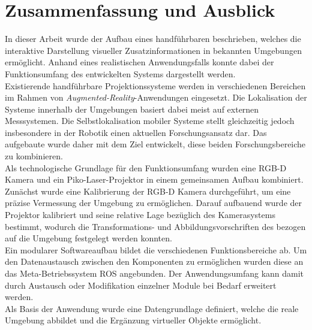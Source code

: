\chapter{Zusammenfassung und Ausblick}
\label{chap.zusammenfassung}

In dieser Arbeit wurde der Aufbau eines handführbaren \kps{} beschrieben, welches die interaktive Darstellung visueller Zusatzinformationen in bekannten Umgebungen ermöglicht. Anhand eines realistischen Anwendungsfalls konnte dabei der Funktionsumfang des entwickelten Systems dargestellt werden.\\

Existierende handführbare Projektionssysteme werden in verschiedenen Bereichen im Rahmen von \textit{Augmented-Reality}-Anwendungen eingesetzt. Die Lokalisation der Systeme innerhalb der Umgebungen basiert dabei meist auf externen Messsystemen. Die Selbstlokalisation mobiler Systeme stellt gleichzeitig jedoch insbesondere in der Robotik einen aktuellen Forschungsansatz dar. Das aufgebaute \kps{} wurde daher mit dem Ziel entwickelt, diese beiden Forschungsbereiche zu kombinieren.\\

Als technologische Grundlage für den Funktionsumfang wurden eine RGB-D Kamera und ein Piko-Laser-Projektor in einem gemeinsamen Aufbau kombiniert. Zunächst wurde eine Kalibrierung der RGB-D Kamera durchgeführt, um eine präzise Vermessung der Umgebung zu ermöglichen. Darauf aufbauend wurde der Projektor kalibriert und seine relative Lage bezüglich des Kamerasystems bestimmt, wodurch die Transformations- und Abbildungsvorschriften des  bezogen auf die Umgebung festgelegt werden konnten.\\

Ein modularer Softwareaufbau bildet die verschiedenen Funktionsbereiche ab. Um den Datenaustausch zwischen den Komponenten zu ermöglichen wurden diese an das Meta-Betriebssystem ROS angebunden. Der Anwendungsumfang kann damit durch Austausch oder Modifikation einzelner Module bei Bedarf erweitert werden.\\
Als Basis der Anwendung wurde eine Datengrundlage definiert, welche die reale Umgebung abbildet und die Ergänzung virtueller Objekte ermöglicht. \\
 
